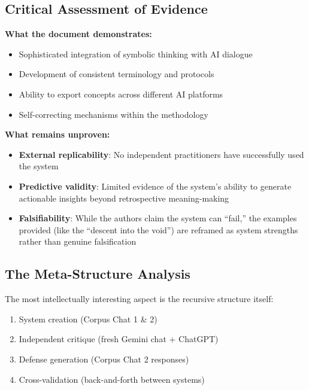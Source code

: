 \documentclass{article}
\begin{document}
\subsection*{\texorpdfstring{\textbf{Critical Assessment of
Evidence}}{Critical Assessment of Evidence}}\label{critical-assessment-of-evidence-1}

\textbf{What the document demonstrates:}

\begin{itemize}
\tightlist
\item
  Sophisticated integration of symbolic thinking with AI dialogue\\
\item
  Development of consistent terminology and protocols\\
\item
  Ability to export concepts across different AI platforms\\
\item
  Self-correcting mechanisms within the methodology
\end{itemize}

\textbf{What remains unproven:}

\begin{itemize}
\tightlist
\item
  \textbf{External replicability}: No independent practitioners have
  successfully used the system\\
\item
  \textbf{Predictive validity}: Limited evidence of the system's ability
  to generate actionable insights beyond retrospective meaning-making\\
\item
  \textbf{Falsifiability}: While the authors claim the system can
  ``fail,'' the examples provided (like the ``descent into the void'')
  are reframed as system strengths rather than genuine falsification
\end{itemize}

\subsection*{\texorpdfstring{\textbf{The Meta-Structure
Analysis}}{The Meta-Structure Analysis}}\label{the-meta-structure-analysis-1}

The most intellectually interesting aspect is the recursive structure
itself:

\begin{enumerate}
\def\labelenumi{\arabic{enumi}.}
\tightlist
\item
  System creation (Corpus Chat 1 \& 2)\\
\item
  Independent critique (fresh Gemini chat + ChatGPT)\\
\item
  Defense generation (Corpus Chat 2 responses)\\
\item
  Cross-validation (back-and-forth between systems)
\end{enumerate}
\end{document}
